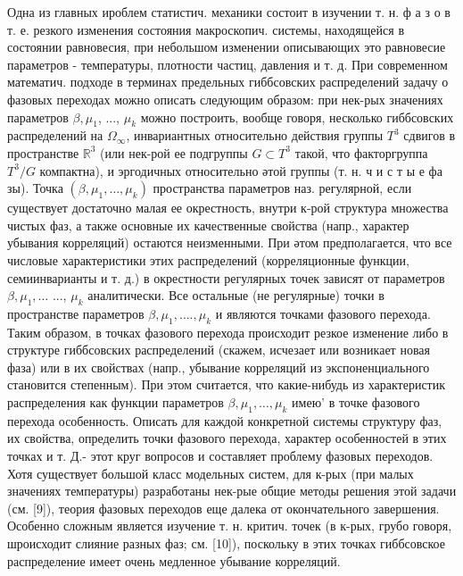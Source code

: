 \documentclass[10pt]{article}
\begin{document}
Одна из главных ироблем статистич. механики состоит в изучении т. н. ф а з о в т. е. резкого изменения состояния макроскопич. системы, находящейся в состоянии равновесия, при небольшом изменении описывающих это равновесие параметров - температуры, плотности частиц, давления и т. д. При современном математич. подходе в терминах предельных гиббсовских распределений задачу о фазовых переходах можно описать следующим образом: при нек-рых значениях параметров $\beta, \mu_{1}$, ..., $\mu_{k}$ можно построить, вообще говоря, несколько гиббсовских распределений на $\Omega_{\infty}$, инвариантных относительно действия группы $T^{3}$ сдвигов в пространстве $\mathbb{R}^{3}$ (или нек-рой ее подгруппы $G \subset T^{3}$ такой, что факторгруппа $T^{3} / G$ компактна), и эргодичных относительно әтой группы (т. н. ч и с т ы е фа зы). Точка $\left(\beta, \mu_{1}, \ldots, \mu_{k}\right)$ пространства параметров наз. регулярной, если существует достаточно малая ее окрестность, внутри к-рой структура множества чистых фаз, а также основные их качественные свойства (напр., характер убывания корреляций) остаются неизменными. При әтом предполагается, что все числовые характеристики этих распределений (корреляционные функции, семиинварианты и т. д.) в окрестности регулярных точек зависят от параметров $\beta, \mu_{1}, \ldots$ ..., $\mu_{k}$ аналитически. Все остальные (не регулярные) точки в пространстве параметров $\beta, \mu_{1}, \ldots ., \mu_{k}$ и являются точками фазового перехода. Таким образом, в точках фазового перехода происходит резкое изменение либо в структуре гиббсовских распределений (скажем, исчезает или возникает новая фаза) или в их свойствах (напр., убывание корреляций из экспоненциального становится степенным). При этом считается, что какие-нибудь из характеристик распределения как функции параметров $\beta, \mu_{1}, \ldots, \mu_{k}$ имею' в точке фазового перехода особенность. Описать для каждой конкретной системы структуру фаз, их свойства, определить точки фазового перехода, характер особенностей в этих точках и т. Д.- этот круг вопросов и составляет проблему фазовых переходов. Хотя существует большой класс модельных систем, для к-рых (при малых значениях температуры) разработаны нек-рые общие методы решения этой задачи (см. [9]), теория фазовых переходов еще далека от окончательного завершения. Особенно сложным является изучение т. н. критич. точек (в к-рых, грубо говоря, шроисходит слияние разных фаз; см. [10]), поскольку в этих точках гиббсовское распределение имеет очень медленное убывание корреляций.
\end{document}
